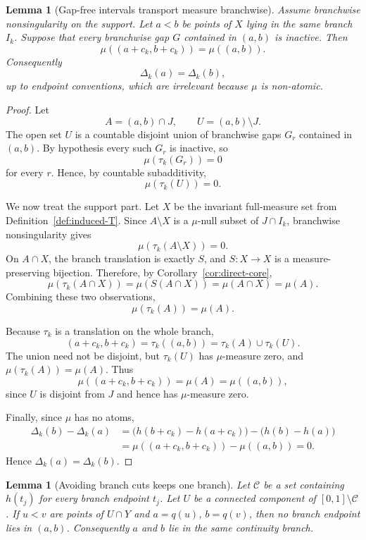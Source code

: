 \documentclass[11pt]{amsart}
\theoremstyle{plain}
\newtheorem{lemma}[theorem]{Lemma}
\theoremstyle{definition}
\theoremstyle{remark}
\newcommand{\cC}{\mathcal C}
\begin{document}
\begin{lemma}[Gap-free intervals transport measure branchwise]\label{lem:branch-transport-away-gaps}
Assume branchwise nonsingularity on the support. Let $a<b$ be points of $X$ lying in the same branch $I_k$. Suppose that every branchwise gap $G$ contained in $(a,b)$ is inactive. Then
\[
        \mu((a+c_k,b+c_k))=\mu((a,b)).
\]
Consequently
\[
        \Delta_k(a)=\Delta_k(b),
\]
up to endpoint conventions, which are irrelevant because $\mu$ is non-atomic.
\end{lemma}

\begin{proof}
Let
\[
        A=(a,b)\cap J,
        \qquad
        U=(a,b)\setminus J.
\]
The open set $U$ is a countable disjoint union of branchwise gaps $G_r$ contained in $(a,b)$. By hypothesis every such $G_r$ is inactive, so
\[
        \mu(\tau_k(G_r))=0
\]
for every $r$. Hence, by countable subadditivity,
\[
        \mu(\tau_k(U))=0.
\]

We now treat the support part. Let $X$ be the invariant full-measure set from Definition~\ref{def:induced-T}. Since $A\setminus X$ is a $\mu$-null subset of $J\cap I_k$, branchwise nonsingularity gives
\[
        \mu(\tau_k(A\setminus X))=0.
\]
On $A\cap X$, the branch translation is exactly $S$, and $S:X\to X$ is a measure-preserving bijection. Therefore, by Corollary~\ref{cor:direct-core},
\[
        \mu(\tau_k(A\cap X))=\mu(S(A\cap X))=\mu(A\cap X)=\mu(A).
\]
Combining these two observations,
\[
        \mu(\tau_k(A))=\mu(A).
\]

Because $\tau_k$ is a translation on the whole branch,
\[
        (a+c_k,b+c_k)=\tau_k((a,b))=\tau_k(A)\cup\tau_k(U).
\]
The union need not be disjoint, but $\tau_k(U)$ has $\mu$-measure zero, and $\mu(\tau_k(A))=\mu(A)$. Thus
\[
        \mu((a+c_k,b+c_k))=\mu(A)=\mu((a,b)),
\]
since $U$ is disjoint from $J$ and hence has $\mu$-measure zero.

Finally, since $\mu$ has no atoms,
\[
\begin{aligned}
\Delta_k(b)-\Delta_k(a)
&=\bigl(h(b+c_k)-h(a+c_k)\bigr)-\bigl(h(b)-h(a)\bigr)\\
&=\mu((a+c_k,b+c_k))-\mu((a,b))=0.
\end{aligned}
\]
Hence $\Delta_k(a)=\Delta_k(b)$.
\end{proof}


\begin{lemma}[Avoiding branch cuts keeps one branch]\label{lem:avoid-branch-cuts}
Let $\cC$ be a set containing $h(t_j)$ for every branch endpoint $t_j$. Let $U$ be a connected component of $[0,1]\setminus\cC$. If $u<v$ are points of $U\cap Y$ and $a=q(u)$, $b=q(v)$, then no branch endpoint lies in $(a,b)$. Consequently $a$ and $b$ lie in the same continuity branch.
\end{lemma}
\end{document}
